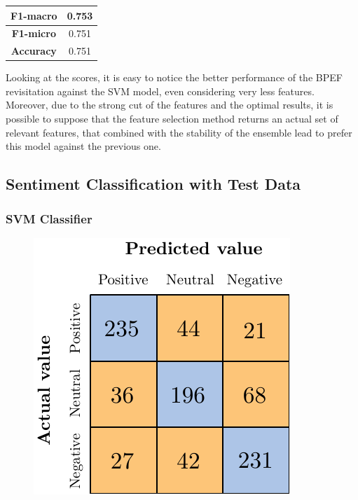 \begin{center}
	\begin{tabular}{ | c | c | } 
		\hline
		\textbf{F1-macro} & 0.753 \\
		\hline
		\textbf{F1-micro} & 0.751 \\ 
		\hline
		\textbf{Accuracy} & 0.751 \\ 
		\hline
	\end{tabular}
\end{center}

Looking at the scores, it is easy to notice the better performance of the BPEF revisitation against the SVM model, even considering very less features. Moreover, due to the strong cut of the features and the optimal results, it is possible to suppose that the feature selection method returns an actual set of relevant features, that combined with the stability of the ensemble lead to prefer this model against the previous one.



\subsection{Sentiment Classification with Test Data}

\subsubsection{SVM Classifier}

\begin{figure}[H]
	\centering
	\includegraphics[scale=1]{figures/conf_matrices/twitter_snt_svm/twitter_snt_svm_tst.pdf}
	\label{fig:tw_snt_svm_tst}
\end{figure}


